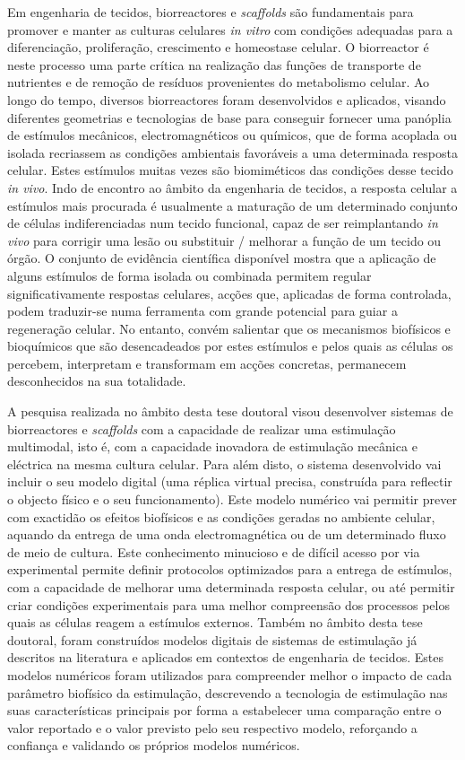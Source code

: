 \documentclass[12pt]{report}
\begin{document}
Em engenharia de tecidos, biorreactores e \textit{scaffolds} são fundamentais para promover e manter as culturas celulares \textit{in vitro} com condições adequadas para a diferenciação, proliferação, crescimento e homeostase celular. O biorreactor é neste processo uma parte crítica na realização das funções de transporte de nutrientes e de remoção de resíduos provenientes do metabolismo celular. Ao longo do tempo, diversos biorreactores foram desenvolvidos e aplicados, visando diferentes geometrias e tecnologias de base para conseguir fornecer uma panóplia de estímulos mecânicos, electromagnéticos ou químicos, que de forma acoplada ou isolada recriassem as condições ambientais favoráveis a uma determinada resposta celular. Estes estímulos muitas vezes são biomiméticos das condições desse tecido \textit{in vivo}. Indo de encontro ao âmbito da engenharia de tecidos, a resposta celular a estímulos mais procurada é usualmente a maturação de um determinado conjunto de células indiferenciadas num tecido funcional, capaz de ser reimplantando \textit{in vivo} para corrigir uma lesão ou substituir / melhorar a função de um tecido ou órgão. O conjunto de evidência científica disponível mostra que a aplicação de alguns estímulos de forma isolada ou combinada permitem regular significativamente respostas celulares, acções que, aplicadas de forma controlada, podem traduzir-se numa ferramenta com grande potencial para guiar a regeneração celular. No entanto, convém salientar que os mecanismos biofísicos e bioquímicos que são desencadeados por estes estímulos e pelos quais as células os percebem, interpretam e transformam em acções concretas, permanecem desconhecidos na sua totalidade.

A pesquisa realizada no âmbito desta tese doutoral visou desenvolver sistemas de biorreactores e \textit{scaffolds} com a capacidade de realizar uma estimulação multimodal, isto é, com a capacidade inovadora de estimulação mecânica e eléctrica na mesma cultura celular. Para além disto, o sistema desenvolvido vai incluir o seu modelo digital (uma réplica virtual precisa, construída para reflectir o objecto físico e o seu funcionamento). Este modelo numérico vai permitir prever com exactidão os efeitos biofísicos e as condições geradas no ambiente celular, aquando da entrega de uma onda electromagnética ou de um determinado fluxo de meio de cultura. Este conhecimento minucioso e de difícil acesso por via experimental permite definir protocolos optimizados para a entrega de estímulos, com a capacidade de melhorar uma determinada resposta celular, ou até permitir criar condições experimentais para uma melhor compreensão dos processos pelos quais as células reagem a estímulos externos. Também no âmbito desta tese doutoral, foram construídos modelos digitais de sistemas de estimulação já descritos na literatura e aplicados em contextos de engenharia de tecidos. Estes modelos numéricos foram utilizados para compreender melhor o impacto de cada parâmetro biofísico da estimulação, descrevendo a tecnologia de estimulação nas suas características principais por forma a estabelecer uma comparação entre o valor reportado e o valor previsto pelo seu respectivo modelo, reforçando a confiança e validando os próprios modelos numéricos.
\end{document}
